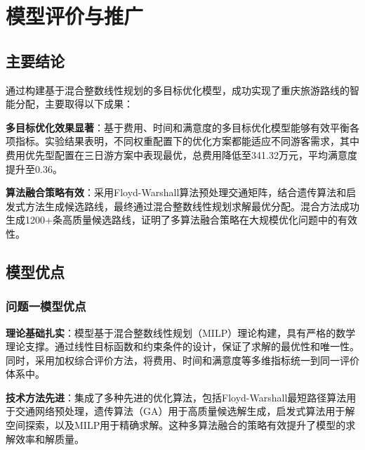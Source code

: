 \chapter[\hspace{0pt}模型评价与推广]{{\heiti{}\hspace{0pt}模型评价与推广}}\label{chapter4: 模型评价与推广}
\removelofgap
\removelotgap

\section[\hspace{-2pt}主要结论]{{\heiti{} \hspace{-8pt}主要结论}}\label{section5: 主要结论}

通过构建基于混合整数线性规划的多目标优化模型，成功实现了重庆旅游路线的智能分配，主要取得以下成果：

\noindent\textbf{多目标优化效果显著}：基于费用、时间和满意度的多目标优化模型能够有效平衡各项指标。实验结果表明，不同权重配置下的优化方案都能适应不同游客需求，其中费用优先型配置在三日游方案中表现最优，总费用降低至341.32万元，平均满意度提升至0.36。

\noindent\textbf{算法融合策略有效}：采用Floyd-Warshall算法预处理交通矩阵，结合遗传算法和启发式方法生成候选路线，最终通过混合整数线性规划求解最优分配。混合方法成功生成1200+条高质量候选路线，证明了多算法融合策略在大规模优化问题中的有效性。

\section[\hspace{-2pt}模型优点]{{\heiti{} \hspace{-8pt}模型优点}}\label{section5: 模型优点}

\subsection[\hspace{-2pt}问题一模型优点]{{\heiti{} \hspace{-8pt}问题一模型优点}}\label{subsection5: 问题一模型优点}

\noindent\textbf{理论基础扎实}：模型基于混合整数线性规划（MILP）理论构建，具有严格的数学理论支撑。通过线性目标函数和约束条件的设计，保证了求解的最优性和唯一性。同时，采用加权综合评价方法，将费用、时间和满意度等多维指标统一到同一评价体系中。

\noindent\textbf{技术方法先进}：集成了多种先进的优化算法，包括Floyd-Warshall最短路径算法用于交通网络预处理，遗传算法（GA）用于高质量候选解生成，启发式算法用于解空间探索，以及MILP用于精确求解。这种多算法融合的策略有效提升了模型的求解效率和解质量。

